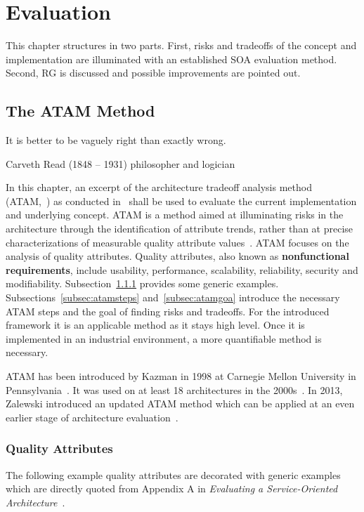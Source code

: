 \chapter{Evaluation\label{cha:chapter6}}
This chapter structures in two parts. First, risks and tradeoffs of the concept and implementation are illuminated with an established SOA evaluation method. Second, RG is discussed and possible improvements are pointed out.

\section{The ATAM Method}
\epigraph{It is better to be vaguely right than exactly wrong.}{Carveth Read (1848 – 1931) philosopher and logician}
In this chapter, an excerpt of the architecture tradeoff analysis method (ATAM,~\cite{Kazman1998TheMethod}) as conducted in~\cite{Bianco2007EvaluatingArchitecture} shall be used to evaluate the current implementation and underlying concept. ATAM is a method aimed at illuminating risks in the architecture through the identification of attribute trends, rather than at precise characterizations of measurable quality attribute values~\cite{Kazman1999ExperienceAnalysis}. ATAM focuses on the analysis of quality attributes. Quality attributes, also known as \textbf{nonfunctional requirements}, include usability, performance, scalability, reliability, security and modifiability. Subsection~\ref{subseb:qualatt} provides some generic examples. Subsections~\ref{subsec:atamsteps} and~\ref{subsec:atamgoa} introduce the necessary ATAM steps and the goal of finding risks and tradeoffs. For the introduced framework it is an applicable method as it stays high level. Once it is implemented in an industrial environment, a more quantifiable method is necessary.  

ATAM has been introduced by Kazman in 1998 at Carnegie Mellon University in Pennsylvania~\cite{Kazman1998TheMethod}. It was used on at least 18 architectures in the 2000s~\cite{Bass2007RiskEvaluations}. In 2013, Zalewski introduced an updated ATAM method which can be applied at an even earlier stage of architecture evaluation~\cite{Zalewski2013BeyondSystems}.

\subsection{Quality Attributes}
\label{subseb:qualatt}
The following example quality attributes are decorated with generic examples which are directly quoted from Appendix A in \textit{Evaluating a Service-Oriented Architecture}~\cite{Bianco2007EvaluatingArchitecture}.
